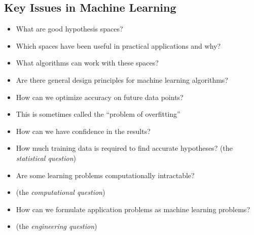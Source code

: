 \subsection{Key Issues in Machine Learning}
\begin{itemize}
  \item What are good hypothesis spaces?
  \item[] Which spaces have been useful in practical applications and why?
  \item What algorithms can work with these spaces?
  \item[] Are there general design principles for machine learning algorithms?
  \item How can we optimize accuracy on future data points?
  \item[] This is sometimes called the ``problem of overfitting''
  \item How can we have confidence in the results?
  \item[] How much training data is required to find accurate hypotheses? (the \emph{statistical question})
  \item Are some learning problems computationally intractable?
  \item[] (the \emph{computational question})
  \item How can we formulate application problems as machine learning problems?
  \item[] (the \emph{engineering question})
\end{itemize}
